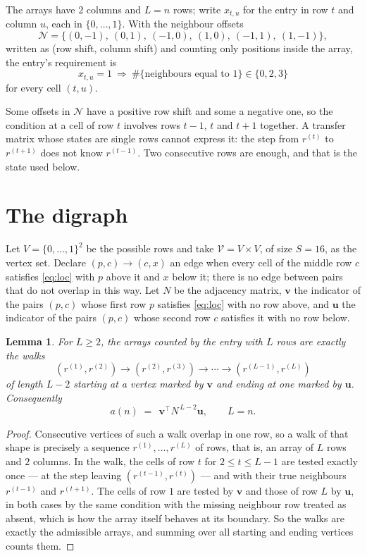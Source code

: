 \documentclass[11pt,a4paper]{article}
\theoremstyle{plain}
\newtheorem{lemma}[theorem]{Lemma}
\theoremstyle{definition}
\begin{document}
The arrays have $2$ columns and $L=n$ rows; write $x_{t,u}$ for the entry in
row $t$ and column $u$, each in $\{0,\dots,1\}$. With the neighbour offsets
\[
\mathcal N=\{(0,-1),\ (0,1),\ (-1,0),\ (1,0),\ (-1,1),\ (1,-1)\},
\]
written as (row shift, column shift) and counting only positions inside the array, the
entry's requirement is
\begin{equation}\label{eq:loc}
x_{t,u}=1\ \Rightarrow\ \#\{\text{neighbours equal to }1\}\in\{0,2,3\}
\end{equation}
for every cell $(t,u)$.

Some offsets in $\mathcal N$ have a positive row shift and some a negative one, so the
condition at a cell of row $t$ involves rows $t-1$, $t$ and $t+1$ together. A transfer
matrix whose states are single rows cannot express it: the step from $r^{(t)}$ to
$r^{(t+1)}$ does not know $r^{(t-1)}$. Two consecutive rows are enough, and that is
the state used below.

\section{The digraph}

Let $V=\{0,\dots,1\}^{2}$ be the possible rows and take
$\mathcal V=V\times V$, of size $S=16$, as the vertex set. Declare $(p,c)\to(c,x)$ an edge
when every cell of the middle row $c$ satisfies \eqref{eq:loc} with $p$ above it and $x$
below it; there is no edge between pairs that do not overlap in this way. Let $N$ be the
adjacency matrix, $\mathbf{v}$ the indicator of the pairs $(p,c)$ whose first row $p$
satisfies \eqref{eq:loc} with no row above, and $\mathbf{u}$ the indicator of
the pairs $(p,c)$ whose second row $c$ satisfies it with no row below.

\begin{lemma}\label{lem:walk}
For $L\ge2$, the arrays counted by the entry with $L$ rows are exactly the walks
\[
(r^{(1)},r^{(2)})\to(r^{(2)},r^{(3)})\to\cdots\to(r^{(L-1)},r^{(L)})
\]
of length $L-2$ starting at a vertex marked by $\mathbf{v}$ and ending at one marked by
$\mathbf{u}$. Consequently
\[
a(n)\;=\;\,\mathbf{v}^{\!\top}N^{\,L-2}\mathbf{u},\qquad L=n .
\]
\end{lemma}

\begin{proof}
Consecutive vertices of such a walk overlap in one row, so a walk of that shape is
precisely a sequence $r^{(1)},\dots,r^{(L)}$ of rows, that is, an array of $L$ rows
and $2$ columns. In the walk, the cells of row $t$ for $2\le t\le L-1$ are tested
exactly once --- at the step leaving $(r^{(t-1)},r^{(t)})$ --- and with their true
neighbours $r^{(t-1)}$ and $r^{(t+1)}$. The cells of row $1$ are tested by
$\mathbf{v}$ and those of row $L$ by $\mathbf{u}$, in both cases by the same condition
with the missing neighbour row treated as absent, which is how the array itself behaves at
its boundary. So the walks are exactly the admissible arrays, and summing over all starting
and ending vertices counts them.
\end{proof}
\end{document}
